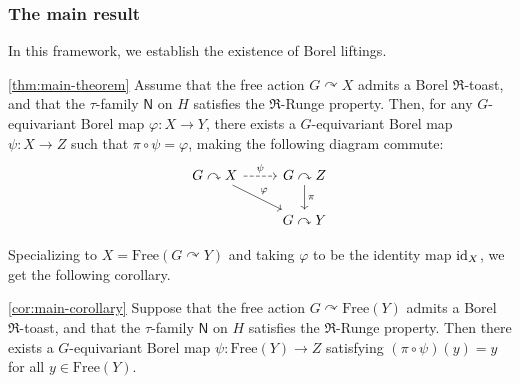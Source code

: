 \documentclass[12pt]{paper}
\numberwithin{equation}{section}
\theoremstyle{plain}
\theoremstyle{definition}
\newcommand{\mfR}{\mathfrak{R}}
\newcommand{\unifn}{\mathsf{N}}
\newcommand{\acts}{\curvearrowright}
\newcommand{\free}{\mathrm{Free}}
\renewcommand{\phi}{\varphi}
\begin{document}
\subsubsection{The main result}
In this framework, we establish the existence of Borel liftings.

\begin{customthm}{{\ref*{thm:main-theorem}}}
  Assume that the free action \(G \acts X\) admits a Borel \(\mfR\)-toast, and that the
  \(\tau\)-family \(\unifn\) on \(H\) satisfies the \(\mfR\)-Runge property.  Then, for any
  \(G\)-equivariant Borel map \(\phi : X \to Y\), there exists a \(G\)-equivariant Borel map
  \(\psi : X \to Z\) such that \(\pi \circ \psi = \phi\), making the following diagram commute:
  \begin{displaymath}
    \begin{tikzcd}[ampersand replacement=\&]
      G \acts X \arrow[r, dashed, "\psi"] \arrow[dr, "\phi"]
      \& G \acts Z \arrow[d, "\pi"]\\
      \& G \acts Y
    \end{tikzcd}
  \end{displaymath}
\end{customthm}


Specializing to \(X=\free(G\acts Y)\) and taking \(\phi\) to be the identity map \({\rm id}_X\), we
get the following corollary.

\begin{customcor}{\ref*{cor:main-corollary}}
  Suppose that the free action \(G \acts \free(Y)\) admits a Borel \(\mfR\)-toast, and that the
  \(\tau\)-family \(\unifn\) on \(H\) satisfies the \(\mfR\)-Runge property.  Then there exists a
  \(G\)-equivariant Borel map \(\psi : \free(Y) \to Z\) satisfying \((\pi \circ \psi)(y) = y\) for
  all \(y \in \free(Y)\).
\end{customcor}
\end{document}
